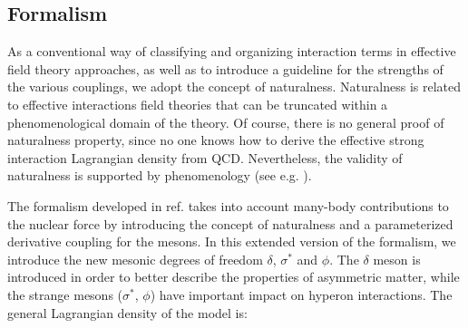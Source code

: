 \documentclass[twocolumn,showpacs,aps]{revtex4}
\begin{document}
\subsection{Formalism} 
As a conventional way of classifying and organizing interaction terms in effective field theory approaches, 
as well as to introduce a guideline for the strengths of the various couplings, we adopt the concept of naturalness.
Naturalness is related to effective interactions field theories that can be truncated within a phenomenological
domain of the theory.
Of course, there is no general proof of naturalness property, since no one knows how to derive the effective strong 
interaction Lagrangian density from QCD. 
Nevertheless, the validity of naturalness is supported by phenomenology (see e.g. \cite{Vasconcellos:2014qua}).


The formalism developed in ref. \cite{Taurines:2000zb} takes into account many-body contributions to the nuclear force 
by introducing the concept of naturalness and a parameterized derivative coupling for the mesons.
In this extended version of the formalism, we introduce the new mesonic degrees of freedom $\delta$, $\sigma^*$ and $\phi$.
The $\delta$ meson is introduced in order to better describe the properties of asymmetric matter, while 
the strange mesons ($\sigma^*$, $\phi$) have important impact on hyperon interactions.
The general Lagrangian density of the model is:
\end{document}
